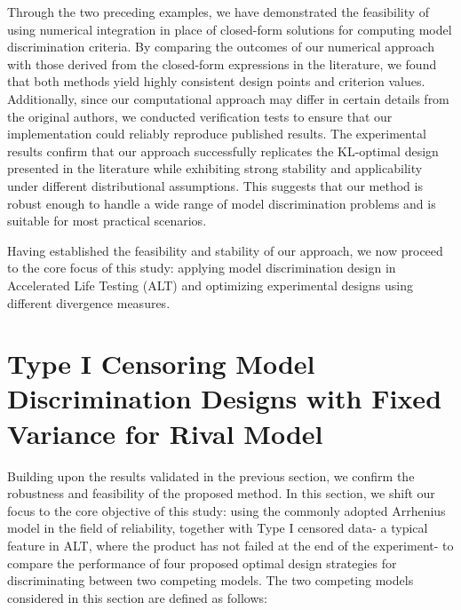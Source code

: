 \hspace*{8mm} Through the two preceding examples, we have demonstrated the feasibility of using numerical integration in place of closed-form solutions for computing model discrimination criteria. By comparing the outcomes of our numerical approach with those derived from the closed-form expressions in the literature, we found that both methods yield highly consistent design points and criterion values. Additionally, since our computational approach may differ in certain details from the original authors, we conducted verification tests to ensure that our implementation could reliably reproduce published results. The experimental results confirm that our approach successfully replicates the KL-optimal design presented in the literature while exhibiting strong stability and applicability under different distributional assumptions. This suggests that our method is robust enough to handle a wide range of model discrimination problems and is suitable for most practical scenarios.

\hspace*{8mm} Having established the feasibility and stability of our approach, we now proceed to the core focus of this study: applying model discrimination design in Accelerated Life Testing (ALT) and optimizing experimental designs using different divergence measures.

\section{Type I Censoring Model Discrimination Designs with Fixed Variance for Rival Model}\label{SEC:DeviceA-fixed variance}

\hspace*{8mm} Building upon the results validated in the previous section, we confirm the robustness and feasibility of the proposed method. In this section, we shift our focus to the core objective of this study: using the commonly adopted Arrhenius model in the field of reliability, together with Type I censored data- a typical feature in ALT, where the product has not failed at the end of the experiment- to compare the performance of four proposed optimal design strategies for discriminating between two competing models. The two competing models considered in this section are defined as follows:

